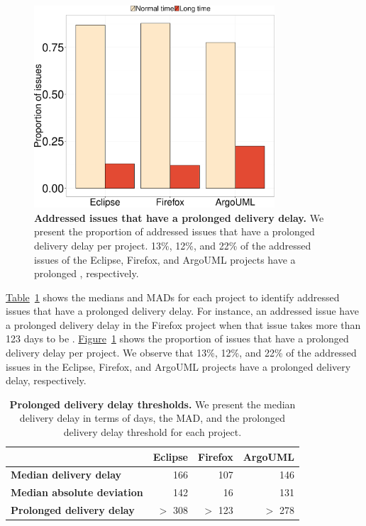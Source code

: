 \begin{figure}
	\centering
	\includegraphics[width=0.80\textwidth,keepaspectratio]
	{chapters/chapter4/figures/largelydelayed_issues_per_project.pdf}
	\caption{\textbf{Addressed issues that have a prolonged delivery delay.} We present
		the proportion of addressed issues that have a prolonged
		delivery delay per project. 13\%, 12\%, and 22\% of the addressed issues
		of the Eclipse, Firefox, and ArgoUML projects have a prolonged
		\DIFdelbeginFL {}\DIFdelendFL \DIFaddbeginFL {}\DIFaddendFL , respectively.}
		\label{ch4:fig:largely_delayed_issues}
	\end{figure}

\hyperref[ch4:tbl:median_plus_mad]{Table}~\ref{ch4:tbl:median_plus_mad} shows
the medians and MADs for each project to identify addressed issues that have a
prolonged delivery delay. For instance, an addressed issue have a prolonged
delivery delay in the Firefox project when that issue takes more than 123 days
to be \DIFdelbegin {}\DIFdelend \DIFaddbegin {}\DIFaddend .
\hyperref[ch4:fig:largely_delayed_issues]{Figure}~\ref{ch4:fig:largely_delayed_issues}
shows the proportion of issues that have a prolonged delivery delay per project.
We observe that 13\%, 12\%, and 22\% of the addressed issues in the Eclipse,
Firefox, and ArgoUML projects have a prolonged delivery delay, respectively. 

\begin{table}[t!]
	\footnotesize
	\centering
	\caption{\textbf{Prolonged delivery delay thresholds.} We present the median
	delivery delay in terms of days, the MAD, and the prolonged delivery delay threshold for each project.}
	\label{ch4:tbl:median_plus_mad}
	\begin{tabular}{lrrr}
		\cline{2-4} 
		\multicolumn{1}{c}{} & \textbf{Eclipse} & \textbf{Firefox} &
		\textbf{ArgoUML}\tabularnewline
		\hline 
		\textbf{Median delivery delay} & 166 & 107 & 146\tabularnewline
		\hline 
		\textbf{Median absolute deviation} & 142 & 16 & 131\tabularnewline
		\hline 
		\textbf{Prolonged delivery delay} & $>$ 308 & $>$ 123 & $>$ 278\tabularnewline
		\hline 
	\end{tabular}
\end{table}

